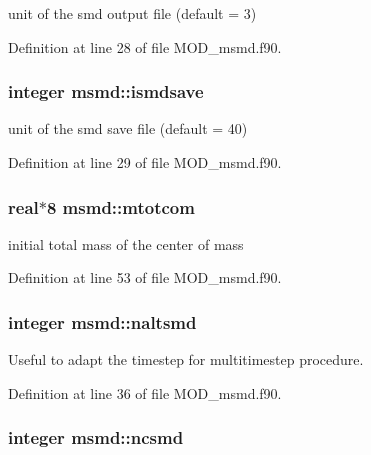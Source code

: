 unit of the smd output file (default = 3) 



Definition at line 28 of file M\-O\-D\-\_\-msmd.\-f90.

\hypertarget{classmsmd_a2d12edd4b10d02323b29a0deb6e1547f}{
\subsubsection[{ismdsave}]{\setlength{\rightskip}{0pt plus 5cm}integer msmd\-::ismdsave}}\label{classmsmd_a2d12edd4b10d02323b29a0deb6e1547f}


unit of the smd save file (default = 40) 



Definition at line 29 of file M\-O\-D\-\_\-msmd.\-f90.

\hypertarget{classmsmd_a52bb0011757c20b7d8f11c546beeb021}{
\subsubsection[{mtotcom}]{\setlength{\rightskip}{0pt plus 5cm}real$\ast$8 msmd\-::mtotcom}}\label{classmsmd_a52bb0011757c20b7d8f11c546beeb021}


initial total mass of the center of mass 



Definition at line 53 of file M\-O\-D\-\_\-msmd.\-f90.

\hypertarget{classmsmd_acbf4807f1ce56dff3f6e6b1f60642586}{
\subsubsection[{naltsmd}]{\setlength{\rightskip}{0pt plus 5cm}integer msmd\-::naltsmd}}\label{classmsmd_acbf4807f1ce56dff3f6e6b1f60642586}


Useful to adapt the timestep for multitimestep procedure. 



Definition at line 36 of file M\-O\-D\-\_\-msmd.\-f90.

\hypertarget{classmsmd_afc4ebe744a30fd19f67574e691308829}{
\subsubsection[{ncsmd}]{\setlength{\rightskip}{0pt plus 5cm}integer msmd\-::ncsmd}}\label{classmsmd_afc4ebe744a30fd19f67574e691308829}


